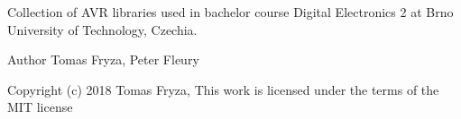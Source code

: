 Collection of AVR libraries used in bachelor course Digital Electronics 2 at Brno University of Technology, Czechia.

\begin{DoxyAuthor}{Author}
Tomas Fryza, Peter Fleury 
\end{DoxyAuthor}
\begin{DoxyCopyright}{Copyright}
(c) 2018 Tomas Fryza, This work is licensed under the terms of the MIT license 
\end{DoxyCopyright}
